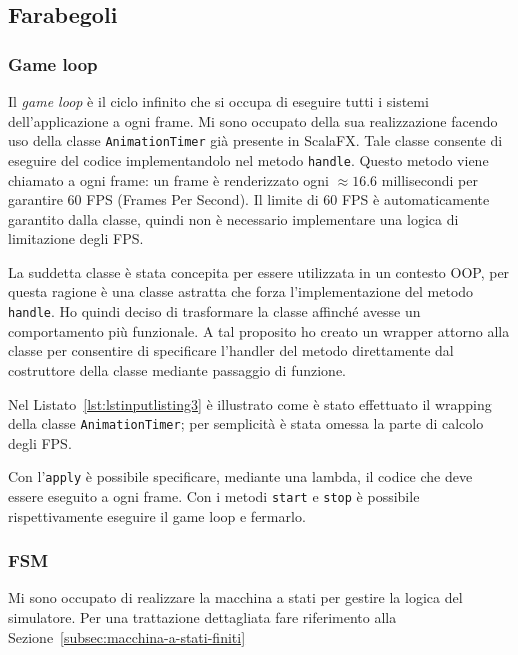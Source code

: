 \subsection{Farabegoli}\label{subsec:demo-farabegoli}
\subsubsection{Game loop}
Il \textit{game loop} è il ciclo infinito che si occupa di eseguire tutti i sistemi dell'applicazione a ogni frame.
Mi sono occupato della sua realizzazione facendo uso della classe \texttt{AnimationTimer} già presente in ScalaFX\@.
Tale classe consente di eseguire del codice implementandolo nel metodo \texttt{handle}.
Questo metodo viene chiamato a ogni frame: un frame è renderizzato ogni $\approx16.6$ millisecondi per garantire 60 FPS
(Frames Per Second).
Il limite di 60 FPS è automaticamente garantito dalla classe, quindi non è necessario implementare una logica
di limitazione degli FPS\@.

La suddetta classe è stata concepita per essere utilizzata in un contesto OOP, per questa ragione è una classe astratta
che forza l'implementazione del metodo \texttt{handle}.
Ho quindi deciso di trasformare la classe affinché avesse un comportamento più funzionale.
A tal proposito ho creato un wrapper attorno alla classe per consentire di specificare l'handler del metodo direttamente
dal costruttore della classe mediante passaggio di funzione.

Nel Listato~\ref{lst:lstinputlisting3} è illustrato come è stato effettuato il wrapping della classe
\texttt{AnimationTimer}; per semplicità è stata omessa la parte di calcolo degli FPS\@.



Con l'\texttt{apply} è possibile specificare, mediante una lambda, il codice che deve essere eseguito a ogni
frame.
Con i metodi \texttt{start} e \texttt{stop} è possibile rispettivamente eseguire il game loop e fermarlo.

\subsubsection{FSM}
Mi sono occupato di realizzare la macchina a stati per gestire la logica del simulatore.
Per una trattazione dettagliata fare riferimento alla Sezione~\ref{subsec:macchina-a-stati-finiti}

